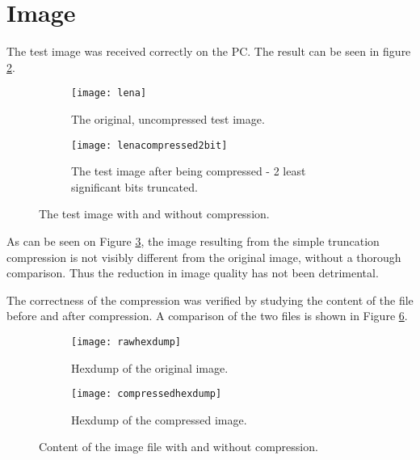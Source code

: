 \section{Image}

The test image was received correctly on the PC. 
The result can be seen in figure \ref{fig:compressedlena}.

\begin{figure}[H]
\centering
\begin{subfigure}{.5\textwidth}
  \centering
  \texttt{[image: lena]}
  \caption{The original, uncompressed test image.}
  \label{fig:lena}
\end{subfigure}%
\begin{subfigure}{.5\textwidth}
  \centering
  \texttt{[image: lenacompressed2bit]}
  \caption{The test image after being  compressed - 2 least significant bits truncated.}
  \label{fig:compressedlena}
\end{subfigure}
\caption{The test image with and without compression.}
\label{fig:lenacomp}
\end{figure}

As can be seen on Figure \ref{fig:lenacomp}, the image resulting from the simple truncation compression is not visibly different from the original image, without a thorough comparison. 
Thus the reduction in image quality has not been detrimental.

The correctness of the compression was verified by studying the content of the file before and after compression. 
A comparison of the two files is shown in Figure \ref{fig:hexlenacomp}. 

\begin{figure}[H]
\centering
\begin{subfigure}{.5\textwidth}
  \centering
  \texttt{[image: rawhexdump]}
  \caption{Hexdump of the original image.}
  \label{fig:lenahex}
\end{subfigure}%
\begin{subfigure}{.5\textwidth}
  \centering
  \texttt{[image: compressedhexdump]}
  \caption{Hexdump of the compressed image.}
  \label{fig:compressedlenahex}
\end{subfigure}
\caption{Content of the image file with and without compression.}
\label{fig:hexlenacomp}
\end{figure}

